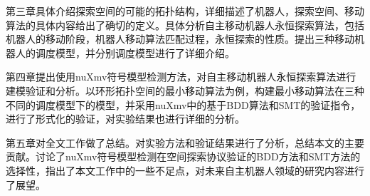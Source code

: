 第三章具体介绍探索空间的可能的拓扑结构，详细描述了机器人，探索空间、移动算法的具体内容给出了确切的定义。具体分析自主移动机器人永恒探索算法，包括机器人的移动阶段，机器人移动算法匹配过程，永恒探索的性质。提出三种移动机器人的调度模型，并分别调度模型进行了详细介绍。

第四章提出使用nuXmv符号模型检测方法，对自主移动机器人永恒探索算法进行建模验证和分析。以环形拓扑空间的最小移动算法为例，构建最小移动算法在三种不同的调度模型下的模型，并采用nuXmv中的基于BDD算法和SMT的验证指令，进行了形式化的验证，对实验结果也进行详细的分析。

第五章对全文工作做了总结。对实验方法和验证结果进行了分析，总结本文的主要贡献。讨论了nuXmv符号模型检测在空间探索协议验证的BDD方法和SMT方法的选择性，指出了本文工作中的一些不足点，对未来自主机器人领域的研究内容进行了展望。
